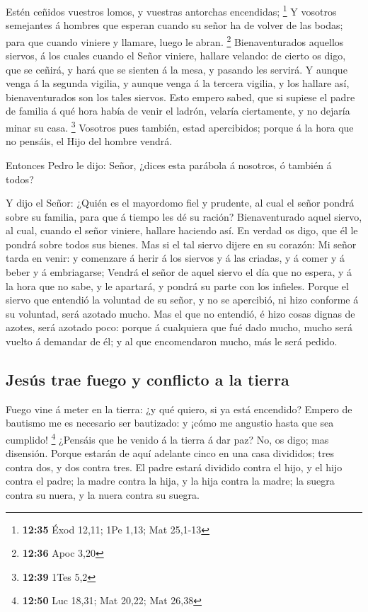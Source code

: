 Estén ceñidos vuestros lomos, y vuestras antorchas
encendidas; \footnote{\textbf{12:35} Éxod 12,11; 1Pe 1,13; Mat 25,1-13}
 Y vosotros semejantes á hombres que esperan cuando su
señor ha de volver de las bodas; para que cuando viniere y llamare,
luego le abran. \footnote{\textbf{12:36} Apoc 3,20} 
Bienaventurados aquellos siervos, á los cuales cuando el Señor viniere,
hallare velando: de cierto os digo, que se ceñirá, y hará que se sienten
á la mesa, y pasando les servirá.  Y aunque venga á la
segunda vigilia, y aunque venga á la tercera vigilia, y los hallare así,
bienaventurados son los tales siervos.  Esto empero
sabed, que si supiese el padre de familia á qué hora había de venir el
ladrón, velaría ciertamente, y no dejaría minar su casa. \footnote{\textbf{12:39}
  1Tes 5,2}  Vosotros pues también, estad apercibidos;
porque á la hora que no pensáis, el Hijo del hombre vendrá.

 Entonces Pedro le dijo: Señor, ¿dices esta parábola á
nosotros, ó también á todos?

 Y dijo el Señor: ¿Quién es el mayordomo fiel y prudente,
al cual el señor pondrá sobre su familia, para que á tiempo les dé su
ración?  Bienaventurado aquel siervo, al cual, cuando el
señor viniere, hallare haciendo así.  En verdad os digo,
que él le pondrá sobre todos sus bienes.  Mas si el tal
siervo dijere en su corazón: Mi señor tarda en venir: y comenzare á
herir á los siervos y á las criadas, y á comer y á beber y á
embriagarse;  Vendrá el señor de aquel siervo el día que
no espera, y á la hora que no sabe, y le apartará, y pondrá su parte con
los infieles.  Porque el siervo que entendió la voluntad
de su señor, y no se apercibió, ni hizo conforme á su voluntad, será
azotado mucho.  Mas el que no entendió, é hizo cosas
dignas de azotes, será azotado poco: porque á cualquiera que fué dado
mucho, mucho será vuelto á demandar de él; y al que encomendaron mucho,
más le será pedido.

\hypertarget{jesuxfas-trae-fuego-y-conflicto-a-la-tierra}{%
\subsection{Jesús trae fuego y conflicto a la
tierra}\label{jesuxfas-trae-fuego-y-conflicto-a-la-tierra}}

 Fuego vine á meter en la tierra: ¿y qué quiero, si ya
está encendido?  Empero de bautismo me es necesario ser
bautizado: y ¡cómo me angustio hasta que sea cumplido! \footnote{\textbf{12:50}
  Luc 18,31; Mat 20,22; Mat 26,38}  ¿Pensáis que he
venido á la tierra á dar paz? No, os digo; mas disensión.
 Porque estarán de aquí adelante cinco en una casa
divididos; tres contra dos, y dos contra tres.  El padre
estará dividido contra el hijo, y el hijo contra el padre; la madre
contra la hija, y la hija contra la madre; la suegra contra su nuera, y
la nuera contra su suegra.

